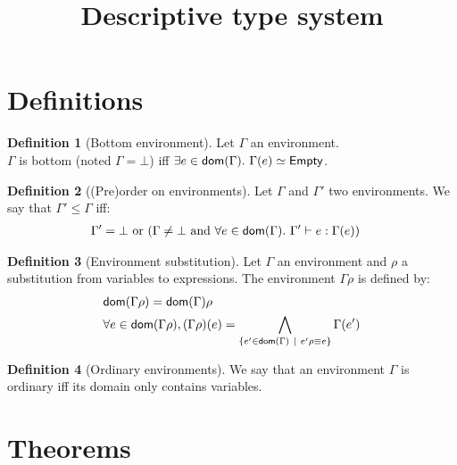 \documentclass[a4paper]{article}
\title{\vspace{1.5cm}Descriptive type system}
\author{}
\date{\vspace{-5ex}}
\theoremstyle{definition}
\newtheorem{definition}{Definition}
\begin{document}
  \maketitle
  
    \section{Definitions}

    \begin{definition}[Bottom environment]
      Let $\Gamma$ an environment.\\
      $\Gamma$ is bottom (noted $\Gamma = \bot$) iff $\exists e\in\dom\Gamma.\ \Gamma(e)\simeq\Empty$.
    \end{definition}

      \begin{definition}[(Pre)order on environments]
        Let $\Gamma$ and $\Gamma'$ two environments. We say that $\Gamma' \leq \Gamma$ iff:
        \begin{align*}
          &\Gamma'=\bot \text{ or } (\Gamma\neq\bot \text{ and } \forall e \in \textsf{dom}(\Gamma).\ \Gamma' \vdash e : \Gamma(e))
        \end{align*}
      \end{definition}
    
      \begin{definition}[Environment substitution]
        Let $\Gamma$ an environment and $\rho$ a substitution from variables to expressions.
        The environment $\Gamma\rho$ is defined by:
        \begin{align*}
          &\textsf{dom}(\Gamma\rho) = \textsf{dom}(\Gamma) \rho\\
          &\forall e \in \textsf{dom}(\Gamma\rho), (\Gamma\rho)(e) = \bigwedge_{\{e' \in \textsf{dom}(\Gamma) ~|~ e'\rho\equiv e\}}\Gamma(e')
        \end{align*}
      \end{definition}
    
      \begin{definition}[Ordinary environments]
        We say that an environment $\Gamma$ is ordinary iff its domain only contains variables.
      \end{definition}

    \section{Theorems}
\end{document}
